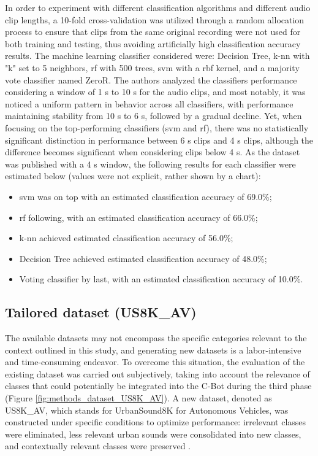 In order to experiment with different classification algorithms and different audio clip lengths, a 10-fold cross-validation was utilized through a random allocation process to ensure that clips from the same original recording were not used for both training and testing, thus avoiding artificially high classification accuracy results. The machine learning classifier considered were: Decision Tree, \gls{k-nn} with "k" set to 5 neighbors, \gls{rf} with 500 trees, \gls{svm} with a \gls{rbf} kernel, and a majority vote classifier named ZeroR. The authors analyzed the classifiers performance considering a window of 1 \gls{s} to 10 \gls{s} for the audio clips, and most notably, it was noticed a uniform pattern in behavior across all classifiers, with performance maintaining stability from 10 \gls{s} to 6 \gls{s}, followed by a gradual decline. Yet, when focusing on the top-performing classifiers (\gls{svm} and \gls{rf}), there was no statistically significant distinction in performance between 6 \gls{s} clips and 4 \gls{s} clips, although the difference becomes significant when considering clips below 4 \gls{s}. As the dataset was published with a 4 \gls{s} window, the following results for each classifier were estimated below (values were not explicit, rather shown by a chart):

\begin{itemize}
    \item \gls{svm} was on top with an estimated classification accuracy of 69.0\%;
    \item \gls{rf} following, with an estimated classification accuracy of 66.0\%;
    \item \gls{k-nn} achieved estimated classification accuracy of 56.0\%;
    \item Decision Tree achieved estimated classification accuracy of 48.0\%;
    \item Voting classifier by last, with an estimated classification accuracy of 10.0\%. 
\end{itemize}


\subsection{Tailored dataset (US8K\_AV)}
\label{subsec:dataset_US8K_AV}

The available datasets may not encompass the specific categories relevant to the context outlined in this study, and generating new datasets is a labor-intensive and time-consuming endeavor. To overcome this situation,  the evaluation of the existing dataset was carried out subjectively, taking into account the relevance of classes that could potentially be integrated into the C-Bot during the third phase (Figure \ref{fig:methods_dataset_US8K_AV}). A new dataset, denoted as US8K\_AV, which stands for UrbanSound8K for Autonomous Vehicles, was constructed under specific conditions to optimize performance: irrelevant classes were eliminated, less relevant urban sounds were consolidated into new classes, and contextually relevant classes were preserved \cite{florentino2024}.

